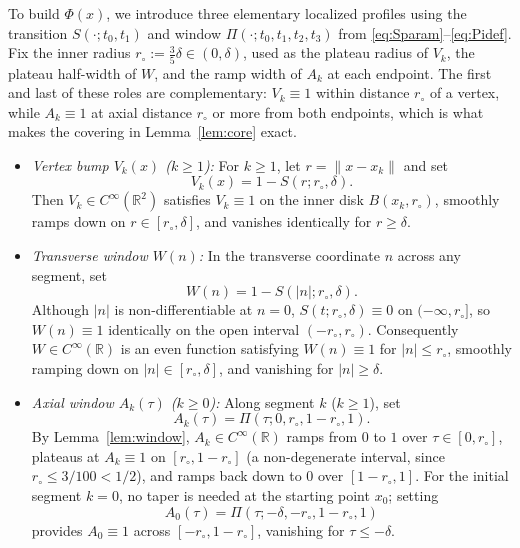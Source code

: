 \documentclass[11pt]{article}
\newcommand{\R}{\mathbb{R}}
\begin{document}
To build $\Phi(x)$, we introduce three elementary localized profiles using the transition $S(\cdot; t_0, t_1)$ and window $\Pi(\cdot; t_0, t_1, t_2, t_3)$ from \eqref{eq:Sparam}--\eqref{eq:Pidef}.
Fix the inner radius $r_\circ := \tfrac35\delta \in (0, \delta)$, used as the plateau radius of $V_k$, the plateau half-width of $W$, and the ramp width of $A_k$ at each endpoint.
The first and last of these roles are complementary: $V_k \equiv 1$ within distance $r_\circ$ of a vertex, while $A_k \equiv 1$ at axial distance $r_\circ$ or more from both endpoints, which is what makes the covering in Lemma~\ref{lem:core} exact.
\begin{itemize}
\item \emph{Vertex bump $V_k(x)$ ($k\ge 1$):}
For $k\ge 1$, let $r = \|x-x_k\|$ and set
\begin{equation}
\label{eq:Vk}
V_k(x) = 1 - S(r; r_\circ, \delta).
\end{equation}
Then $V_k \in C^\infty(\R^2)$ satisfies $V_k \equiv 1$ on the inner disk $B(x_k, r_\circ)$, smoothly ramps down on $r \in [r_\circ, \delta]$, and vanishes identically for $r \ge \delta$.

\item \emph{Transverse window $W(n)$:}
In the transverse coordinate $n$ across any segment, set
\begin{equation}
\label{eq:Wdef}
W(n) = 1 - S(|n|; r_\circ, \delta).
\end{equation}
Although $|n|$ is non-differentiable at $n=0$, $S(t; r_\circ, \delta) \equiv 0$ on $(-\infty, r_\circ]$, so $W(n) \equiv 1$ identically on the open interval $(-r_\circ, r_\circ)$.
Consequently $W \in C^\infty(\R)$ is an even function satisfying $W(n) \equiv 1$ for $|n| \le r_\circ$, smoothly ramping down on $|n| \in [r_\circ, \delta]$, and vanishing for $|n| \ge \delta$.

\item \emph{Axial window $A_k(\tau)$ ($k\ge 0$):}
Along segment $k$ ($k\ge 1$), set
\begin{equation}
\label{eq:Akdef}
A_k(\tau) = \Pi(\tau; 0, r_\circ, 1-r_\circ, 1).
\end{equation}
By Lemma~\ref{lem:window}, $A_k \in C^\infty(\R)$ ramps from $0$ to $1$ over $\tau \in [0, r_\circ]$, plateaus at $A_k \equiv 1$ on $[r_\circ, 1-r_\circ]$ (a non-degenerate interval, since $r_\circ \le 3/100 < 1/2$), and ramps back down to $0$ over $[1-r_\circ, 1]$.
For the initial segment $k=0$, no taper is needed at the starting point $x_0$; setting
\begin{equation}
\label{eq:A0def}
A_0(\tau) = \Pi(\tau; -\delta, -r_\circ, 1-r_\circ, 1)
\end{equation}
provides $A_0 \equiv 1$ across $[-r_\circ, 1-r_\circ]$, vanishing for $\tau \le -\delta$.
\end{itemize}
\end{document}
